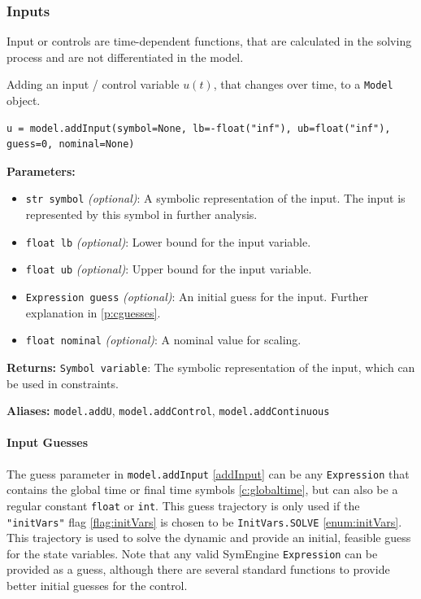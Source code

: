\documentclass[12pt]{article}
\begin{document}
\subsubsection{Inputs}

Input or controls are time-dependent functions, that are calculated in the
solving process and are not differentiated in the model.

\begin{mdframed}[backgroundcolor=gray!10, roundcorner=10pt, linewidth=1pt]

	Adding an input / control variable $u(t)$, that changes over time, to a
	\texttt{Model} object.

	\begin{lstlisting}
u = model.addInput(symbol=None, lb=-float("inf"), ub=float("inf"), guess=0, nominal=None)
	\end{lstlisting}
	\label{addInput}
	\textbf{Parameters:}
	\begin{itemize}
		\item \texttt{str symbol} \emph{(optional)}: A symbolic
		      representation of the input. The input is
		      represented by this symbol in
		      further analysis.
		\item \texttt{float lb} \emph{(optional)}: Lower bound for the
		      input variable.
		\item \texttt{float ub} \emph{(optional)}: Upper bound for the
		      input variable.
		\item \texttt{Expression guess} \emph{(optional)}: An initial
		      guess for the input. Further explanation in
		      \eqref{p:cguesses}.
		\item \texttt{float nominal} \emph{(optional)}: A nominal value
		      for scaling.
	\end{itemize}

	\textbf{Returns:}
	\texttt{Symbol variable}: The symbolic representation of the input,
	which can be used in constraints.

	\textbf{Aliases:}  \texttt{model.addU}, \texttt{model.addControl},
	\texttt{model.addContinuous}
\end{mdframed}

\paragraph{Input Guesses}
\label{p:cguesses}
The guess parameter in \texttt{model.addInput} \eqref{addInput} can be
any \texttt{Expression} that contains the global time or final time symbols
\eqref{c:globaltime}, but can also be a regular constant \texttt{float} or
\texttt{int}. This guess trajectory is only used if the
\texttt{"initVars"} flag \eqref{flag:initVars} is chosen to be
\texttt{InitVars.SOLVE} \eqref{enum:initVars}. This trajectory is used to
solve the dynamic and provide an initial, feasible guess for the state
variables. Note that any valid SymEngine \texttt{Expression} can be provided as
a guess, although there are several standard functions to provide better
initial guesses for the control.
\end{document}
